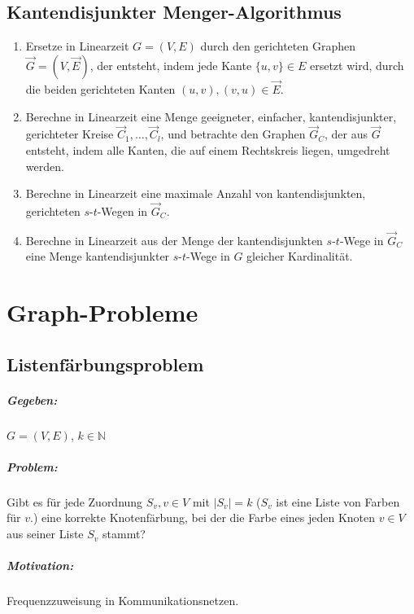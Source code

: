 \documentclass[a4paper,11pt]{report}
\begin{document}
\section{Kantendisjunkter Menger-Algorithmus}
\begin{enumerate}
    \item Ersetze in Linearzeit $G = (V, E)$ durch den gerichteten Graphen $\vec G = (V, \vec E)$, der entsteht, indem jede Kante $\{u, v\} \in E$ ersetzt wird, durch die beiden gerichteten Kanten $(u, v), (v, u) \in \vec E$.
    \item Berechne in Linearzeit eine Menge geeigneter, einfacher, kantendisjunkter, gerichteter Kreise $\vec C_1, \ldots, \vec C_l$, und betrachte den Graphen $\vec G_C$, der aus $\vec G$ entsteht, indem alle Kanten, die auf einem Rechtskreis liegen, umgedreht werden.
    \item Berechne in Linearzeit eine maximale Anzahl von kantendisjunkten, gerichteten $s$-$t$-Wegen in $\vec G_C$.
    \item Berechne in Linearzeit aus der Menge der kantendisjunkten $s$-$t$-Wege in $\vec G_C$ eine Menge kantendisjunkter $s$-$t$-Wege in $G$ gleicher Kardinalität.
\end{enumerate}


\chapter{Graph-Probleme}
\section{Listenfärbungsproblem}
\paragraph{Gegeben:} $G = (V, E)$, $k \in \mathbb{N}$

\paragraph{Problem:} Gibt es für jede Zuordnung $S_v, v \in V$ mit $|S_v| = k$ ($S_v$ ist eine Liste von Farben für $v$.) eine korrekte Knotenfärbung, bei der die Farbe eines jeden Knoten $v \in V$ aus seiner Liste $S_v$ stammt?

\paragraph{Motivation:} Frequenzzuweisung in Kommunikationsnetzen.
\end{document}
